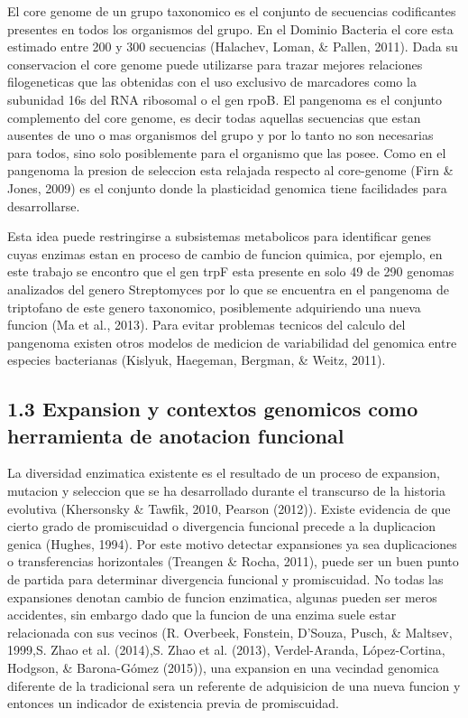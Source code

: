 \documentclass[12pt,twoside]{reedthesis}
\begin{document}
  El core genome de un grupo taxonomico es el conjunto de secuencias
  codificantes presentes en todos los organismos del grupo. En el Dominio
  Bacteria el core esta estimado entre 200 y 300 secuencias (Halachev,
  Loman, \& Pallen, 2011). Dada su conservacion el core genome puede
  utilizarse para trazar mejores relaciones filogeneticas que las
  obtenidas con el uso exclusivo de marcadores como la subunidad 16s del
  RNA ribosomal o el gen rpoB. El pangenoma es el conjunto complemento del
  core genome, es decir todas aquellas secuencias que estan ausentes de
  uno o mas organismos del grupo y por lo tanto no son necesarias para
  todos, sino solo posiblemente para el organismo que las posee. Como en
  el pangenoma la presion de seleccion esta relajada respecto al
  core-genome (Firn \& Jones, 2009) es el conjunto donde la plasticidad
  genomica tiene facilidades para desarrollarse.
  
  Esta idea puede restringirse a subsistemas metabolicos para identificar
  genes cuyas enzimas estan en proceso de cambio de funcion quimica, por
  ejemplo, en este trabajo se encontro que el gen trpF esta presente en
  solo 49 de 290 genomas analizados del genero Streptomyces por lo que se
  encuentra en el pangenoma de triptofano de este genero taxonomico,
  posiblemente adquiriendo una nueva funcion (Ma et al., 2013). Para
  evitar problemas tecnicos del calculo del pangenoma existen otros
  modelos de medicion de variabilidad del genomica entre especies
  bacterianas (Kislyuk, Haegeman, Bergman, \& Weitz, 2011).
  
  \subsection{1.3 Expansion y contextos genomicos como herramienta de
  anotacion
  funcional}\label{expansion-y-contextos-genomicos-como-herramienta-de-anotacion-funcional}
  
  La diversidad enzimatica existente es el resultado de un proceso de
  expansion, mutacion y seleccion que se ha desarrollado durante el
  transcurso de la historia evolutiva (Khersonsky \& Tawfik, 2010, Pearson
  (2012)). Existe evidencia de que cierto grado de promiscuidad o
  divergencia funcional precede a la duplicacion genica (Hughes, 1994).
  Por este motivo detectar expansiones ya sea duplicaciones o
  transferencias horizontales (Treangen \& Rocha, 2011), puede ser un buen
  punto de partida para determinar divergencia funcional y promiscuidad.
  No todas las expansiones denotan cambio de funcion enzimatica, algunas
  pueden ser meros accidentes, sin embargo dado que la funcion de una
  enzima suele estar relacionada con sus vecinos (R. Overbeek, Fonstein,
  D'Souza, Pusch, \& Maltsev, 1999,S. Zhao et al. (2014),S. Zhao et al.
  (2013), Verdel-Aranda, López-Cortina, Hodgson, \& Barona-Gómez (2015)),
  una expansion en una vecindad genomica diferente de la tradicional sera
  un referente de adquisicion de una nueva funcion y entonces un indicador
  de existencia previa de promiscuidad.
  
\end{document}
